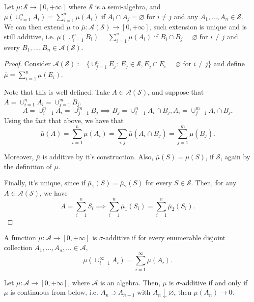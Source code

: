 \begin{proposition}
	Let $\mu: \mathcal S \to [0,+\infty]$ where $\mathcal S$ is a semi-algebra,
	and $\mu(\cup_{i=1}^n A_i) = \sum_{i=1}^n \mu(A_i)$ if $A_i \cap A_j = \varnothing$
	for $i \neq j$ and any $A_1,..., A_n \in \mathcal S$.
	We can then extend $\mu$ to $\bar \mu :\mathcal A(\mathcal S) \to [0,+\infty]$,
	such extension is unique and is still additive, i.e.
	$\bar \mu(\cup_{i=1}^n B_i) = \sum_{i=1}^n \bar\mu(A_i)$ if $B_i \cap B_j = \varnothing$
	for $i\neq j$ and every $B_1,...,B_n \in \mathcal A(\mathcal S)$.
\end{proposition}
\begin{proof}
	Consider $\mathcal A(\mathcal S):=
		\{
		\cup^n_{j=1} E_j : \
		E_j \in \mathcal S, E_j \cap E_i = \varnothing \text{ for }
		i\neq j
		\}$ and define $\bar\mu = \sum^n_{i=1}\mu(E_i)$.

	Note that this is well defined. Take $A \in \mathcal A(\mathcal S)$,
	and suppose that $A = \cup^n_{i=1} A_i = \cup^m_{j=1}B_j$.
	\begin{displaymath}
		A = \cup^n_{i=1} A_i = \cup^m_{j=1}B_j \implies
		B_j = \cup_{i=1}^n A_i \cap B_j, A_i =\cup_{j=1}^m A_i\cap B_j.
	\end{displaymath}
	Using the fact that above, we have that
	\begin{displaymath}
		\bar \mu(A) = \sum^n_{i=1}\mu(A_i)=
		\sum_{i,j} \bar \mu(A_i \cap B_j) =
		\sum^m_{j=1}\mu(B_j).
	\end{displaymath}

	Moreover, $\bar\mu$ is additive by it's construction.
	Also, $\bar \mu(S) = \mu(S)$, if $\mathcal S$, again by the definition of $\bar \mu$.

	Finally, it's unique, since if $\bar \mu_1 (S) = \bar \mu_2(S)$ for every $S \in \mathcal S$.
	Then, for any $A \in \mathcal A(\mathcal S)$, we have
	\begin{displaymath}
		A = \sum^n_{i=1} S_i \implies
		\sum^n_{i=1}\bar \mu_1 (S_i) =  \sum^n_{i=1}\bar \mu_2(S_i).
	\end{displaymath}
\end{proof}

\begin{definition}
	A function $\mu:\mathcal A \to [0,+\infty]$ is $\sigma$-additive
	if for every enumerable disjoint collection $A_1,...,A_n,... \in \mathcal A$,
	\begin{displaymath}
		\mu(\cup^\infty_{i=1}A_i)=
		\sum^\infty_{i=1}\mu(A_i).
	\end{displaymath}
\end{definition}
\begin{lemma}
	Let $\mu:\mathcal A \to [0,+\infty]$, where $\mathcal A$ is an algebra.
	Then, $\mu$ is $\sigma$-additive if and only if $\mu$ is continuous from
	below, i.e. $A_n \supset A_{n+1}$ with $A_n \downarrow \varnothing$, then
	$\mu(A_n) \to 0$.
\end{lemma}


